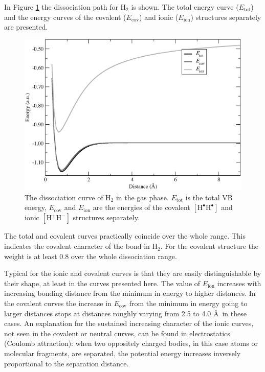 In Figure \ref{ch3.fig.h2_c} the dissociation path for H$_2$ is shown. The total energy curve ($E_\mathrm{tot}$) and the energy curves of the covalent ($E_\mathrm{cov}$) and ionic ($E_\mathrm{ion}$) structures separately are presented. 
\begin{figure}[htbp]
\begin{center}
\includegraphics[scale=0.6]{dissociation/figures/h2_g.eps}
\end{center}
\caption{The dissociation curve of H$_2$ in the gas phase. $E_\mathrm{tot}$ is the total VB energy, $E_\mathrm{cov}$  and $E_\mathrm{ion}$ are the energies of the covalent $[\mathrm{H^\bullet H^\bullet}]$ and ionic $[\mathrm{H^{+}H^{-}}]$ structures separately.}
\label{ch3.fig.h2_c}
\end{figure}
The total and covalent curves practically coincide over the whole range. This indicates the covalent character of the bond in H$_2$. For the covalent structure the weight is at least 0.8 over the whole dissociation range.

Typical for the ionic and covalent curves is that they are easily distinguishable by their shape, at least in the curves presented here. The value of $E_\mathrm{ion}$ increases with increasing bonding distance from the minimum in energy to higher distances. In the covalent curves the increase in $E_\mathrm{cov}$ from the minimum in energy going to larger distances stops at distances roughly varying from 2.5 to 4.0 \AA\ in these cases. An explanation for the sustained increasing character of the ionic curves, not seen in the covalent or neutral curves, can be found in electrostatics (Coulomb attraction): when two oppositely charged bodies, in this case atoms or molecular fragments, are separated, the potential energy increases inversely proportional to the separation distance.

